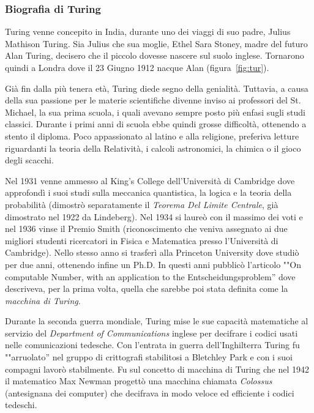 			\subsubsection{Biografia di Turing}
Turing venne concepito in India, durante uno dei viaggi di suo padre, Julius Mathison Turing. Sia Julius che sua moglie, Ethel Sara Stoney, madre del futuro Alan Turing, decisero che il piccolo dovesse nascere sul suolo inglese. Tornarono quindi a Londra dove il 23 Giugno 1912 nacque Alan (figura~\vref{fig:tur}).

Già  fin dalla più tenera età, Turing diede segno della genialità. Tuttavia, a causa della sua passione per le materie scientifiche divenne inviso ai professori del St. Michael, la sua prima scuola, i quali avevano sempre posto più enfasi sugli studi classici. Durante i primi anni di scuola ebbe quindi grosse difficoltà, ottenendo a stento il diploma. Poco appassionato al latino e alla religione, preferiva letture riguardanti la teoria della Relatività, i calcoli astronomici, la chimica o il gioco degli scacchi.

Nel 1931 venne ammesso al King's College dell'Università di Cambridge dove approfondì i suoi studi sulla meccanica quantistica, la logica e la teoria della probabilità (dimostrò separatamente il \emph{Teorema Del Limite Centrale}, già dimostrato nel 1922 da Lindeberg). Nel 1934 si laureò con il massimo dei voti e nel 1936 vinse il Premio Smith (riconoscimento che veniva assegnato ai due migliori studenti ricercatori in Fisica e Matematica presso l'Università di Cambridge). Nello stesso anno si trasferì alla Princeton University dove studiò per due anni, ottenendo infine un Ph.D. In questi anni pubblicò l'articolo ""On computable Number, with an application to the Entscheidungsproblem'' dove descriveva, per la prima volta, quella che sarebbe poi stata definita come la \emph{macchina di Turing}.

Durante  la seconda guerra mondiale, Turing mise le sue capacità matematiche al servizio del \emph{Department of Communications} inglese per decifrare i codici usati nelle comunicazioni tedesche. Con l'entrata in guerra dell'Inghilterra Turing fu ""arruolato'' nel gruppo di crittografi stabilitosi a Bletchley Park e con i suoi compagni lavorò stabilmente. Fu sul concetto di macchina di Turing che nel 1942 il matematico Max Newman progettò una macchina chiamata \emph{Colossus} (antesignana dei computer) che decifrava in modo veloce ed efficiente i codici tedeschi.

